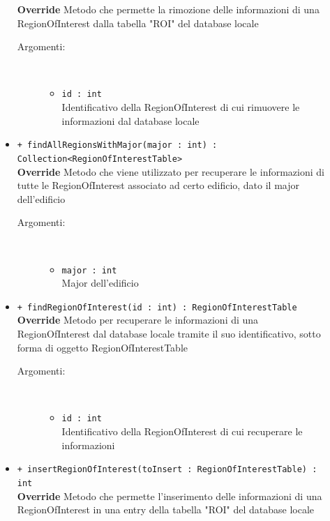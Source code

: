 \documentclass[../DefinizioneDiProdotto.tex]{subfiles}
\begin{document}
\begin{description}
\begin{itemize}
		\textbf{Override} Metodo che permette la rimozione delle informazioni di una RegionOfInterest dalla tabella "ROI" del database locale
		\begin{description}
			\item[Argomenti:] \
			\begin{itemize}
				\item \texttt{id : int}\\
				Identificativo della RegionOfInterest di cui rimuovere le informazioni dal database locale\end{itemize}
		\end{description}
		\item \texttt{+ findAllRegionsWithMajor(major : int) :\\ Collection<RegionOfInterestTable>}\\
		\textbf{Override} Metodo che viene utilizzato per recuperare le informazioni di tutte le RegionOfInterest associato ad certo edificio, dato il major dell'edificio
		\begin{description}
			\item[Argomenti:] \
			\begin{itemize}
				\item \texttt{major : int}\\
				Major dell'edificio\end{itemize}
		\end{description}
		\item \texttt{+ findRegionOfInterest(id : int) : RegionOfInterestTable}\\
		\textbf{Override} Metodo per recuperare le informazioni di una RegionOfInterest dal database locale tramite il suo identificativo, sotto forma di oggetto RegionOfInterestTable
		\begin{description}
			\item[Argomenti:] \
			\begin{itemize}
				\item \texttt{id : int}\\
				Identificativo della RegionOfInterest di cui recuperare le informazioni\end{itemize}
		\end{description}
		\item \texttt{+ insertRegionOfInterest(toInsert : RegionOfInterestTable) : int}\\
		\textbf{Override} Metodo che permette l'inserimento delle informazioni di una RegionOfInterest in una entry della tabella "ROI" del database locale
		\begin{description}

\end{description}
\end{itemize}
\end{description}
\end{document}
